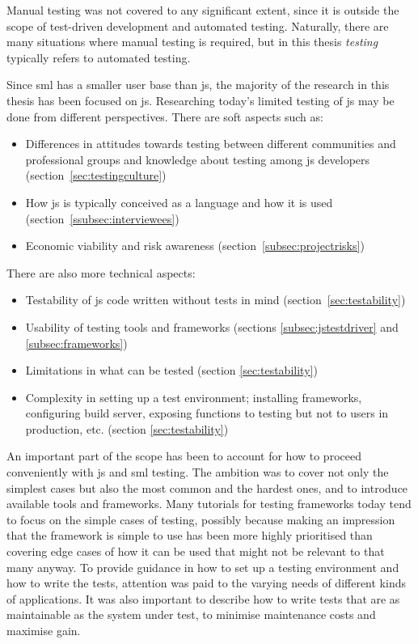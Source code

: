 \documentclass[11pt]{article}
\begin{document}
Manual testing was not covered to any significant extent, since it is outside the scope of test-driven development and automated testing. Naturally, there are many situations where manual testing is required, but in this thesis \emph{testing} typically refers to automated testing.

Since \gls{sml} has a smaller user base than \gls{js}, the majority of the research in this thesis has been focused on \gls{js}. Researching today's limited testing of \gls{js} may be done from different perspectives. There are soft aspects such as:
\begin{itemize}[label={--}]
\item Differences in attitudes towards testing between different communities and professional groups and knowledge about testing among \gls{js} developers (section~\ref{sec:testingculture})
\item How \gls{js} is typically conceived as a language and how it is used (section~\ref{ssubsec:interviewees})
\item Economic viability and risk awareness (section~\ref{subsec:projectrisks})
\end{itemize}

There are also more technical aspects:
\begin{itemize}[label={--}]
\item Testability of \gls{js} code written without tests in mind (section~\ref{sec:testability})
\item Usability of testing tools and frameworks (sections \ref{subsec:jstestdriver} and \ref{subsec:frameworks})
\item Limitations in what can be tested (section \ref{sec:testability})
\item Complexity in setting up a test environment; installing frameworks, configuring build server, exposing functions to testing but not to users in production, etc. (section \ref{sec:testability})
\end{itemize}

An important part of the scope has been to account for how to proceed conveniently with \gls{js} and \gls{sml} testing. The ambition was to cover not only the simplest cases but also the most common and the hardest ones, and to introduce available tools and frameworks. Many tutorials for testing frameworks today tend to focus on the simple cases of testing, possibly because making an impression that the framework is simple to use has been more highly prioritised than covering edge cases of how it can be used that might not be relevant to that many anyway. To provide guidance in how to set up a testing environment and how to write the tests, attention was paid to the varying needs of different kinds of applications. It was also important to describe how to write tests that are as maintainable as the system under test, to minimise maintenance costs and maximise gain.
\end{document}
